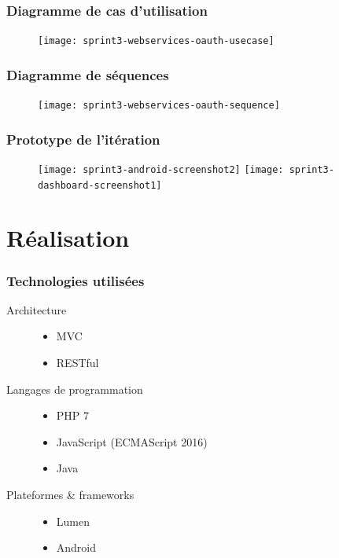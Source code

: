 \documentclass{beamer}
\begin{document}
\begin{frame}
    \frametitle{Diagramme de cas d'utilisation}
    \begin{figure}
        \texttt{[image: sprint3-webservices-oauth-usecase]}
    \end{figure}
\end{frame}

\begin{frame}
    \frametitle{Diagramme de séquences}
    \begin{figure}
        \texttt{[image: sprint3-webservices-oauth-sequence]}
    \end{figure}
\end{frame}

\begin{frame}
    \frametitle{Prototype de l'itération}
    \begin{figure}
        \texttt{[image: sprint3-android-screenshot2]}
        \texttt{[image: sprint3-dashboard-screenshot1]}
    \end{figure}
\end{frame}


\section{Réalisation}

\begin{frame}
    \frametitle{Technologies utilisées}
    \begin{description}
        \item [Architecture] \textbf{}

            \begin{itemize}
                \item MVC
                \item RESTful
            \end{itemize}
        \item [Langages de programmation] \textbf{}

            \begin{itemize}
                \item PHP 7
                \item JavaScript (ECMAScript 2016)
                \item Java
            \end{itemize}
        \item [Plateformes \& frameworks] \textbf{}

            \begin{itemize}
                \item Lumen
                \item Android
            \end{itemize}
    \end{description}
\end{frame}
\end{document}

